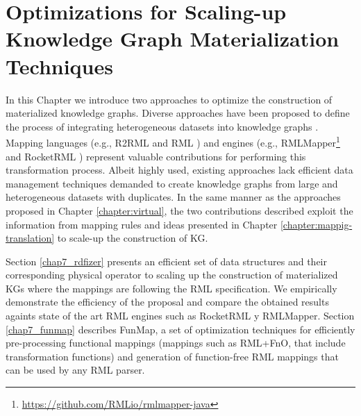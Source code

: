 
\chapter{Optimizations for Scaling-up Knowledge Graph Materialization Techniques}
\label{chapter:construction}


In this Chapter we introduce two approaches to optimize the construction of materialized knowledge graphs. Diverse approaches have been proposed to define the process of integrating heterogeneous datasets into knowledge graphs \citep{chebotko2009semantics,calvanese2017ontop,chaves2019what,priyatna2014formalisation}. Mapping languages (e.g., R2RML \citep{R2RML} and RML \citep{dimou2014rml}) and engines (e.g., RMLMapper\footnote{\url{https://github.com/RMLio/rmlmapper-java}} and RocketRML \citep{csimcsek2019rocketrml}) represent valuable contributions for performing this transformation process. Albeit highly used, existing approaches lack efficient data management techniques demanded to create knowledge graphs from large and heterogeneous datasets with duplicates. In the same manner as the approaches proposed in Chapter \ref{chapter:virtual}, the two contributions described exploit the information from mapping rules and ideas presented in Chapter \ref{chapter:mappig-translation} to scale-up the construction of KG.

Section \ref{chap7_rdfizer} presents an efficient set of data structures and their corresponding physical operator to scaling up the construction of materialized KGs where the mappings are following the RML specification. We empirically demonstrate the efficiency of the proposal and compare the obtained results againts state of the art RML engines such as RocketRML y RMLMapper. Section \ref{chap7_funmap} describes FunMap, a set of optimization techniques for efficiently pre-processing functional mappings (mappings such as RML+FnO, that include transformation functions) and generation of function-free RML mappings that can be used by any RML parser.






